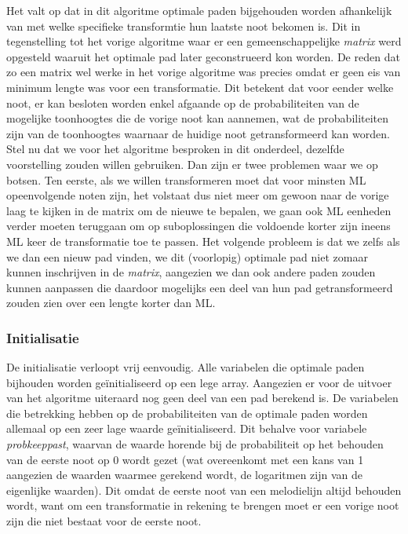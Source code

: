Het valt op dat in dit algoritme optimale paden bijgehouden worden afhankelijk van met welke specifieke transformtie hun laatste noot bekomen is. Dit in tegenstelling tot het vorige algoritme waar er een gemeenschappelijke \textit{matrix} werd opgesteld waaruit het optimale pad later geconstrueerd kon worden. De reden dat zo een matrix wel werke in het vorige algoritme was precies omdat er geen eis van minimum lengte was voor een transformatie. Dit betekent dat voor eender welke noot, er kan besloten worden enkel afgaande op de probabiliteiten van de mogelijke toonhoogtes die de vorige noot kan aannemen, wat de probabiliteiten zijn van de toonhoogtes waarnaar de huidige noot getransformeerd kan worden. Stel nu dat we voor het algoritme besproken in dit onderdeel, dezelfde voorstelling zouden willen gebruiken. Dan zijn er twee problemen waar we op botsen. Ten eerste, als we willen transformeren moet dat voor minsten ML opeenvolgende noten zijn, het volstaat dus niet meer om gewoon naar de vorige laag te kijken in de matrix om de nieuwe te bepalen, we gaan ook ML eenheden verder moeten teruggaan om op suboplossingen die voldoende korter zijn ineens ML keer de transformatie toe te passen. Het volgende probleem is dat we zelfs als we dan een nieuw pad vinden, we dit (voorlopig) optimale pad niet zomaar kunnen inschrijven in de \textit{matrix}, aangezien we dan ook andere paden zouden kunnen aanpassen die daardoor mogelijks een deel van hun pad getransformeerd zouden zien over een lengte korter dan ML. 

\subsubsection{Initialisatie}
De initialisatie verloopt vrij eenvoudig. Alle variabelen die optimale paden bijhouden worden ge\"initialiseerd op een lege array. Aangezien er voor de uitvoer van het algoritme uiteraard nog geen deel van een pad berekend is. De variabelen die betrekking hebben op de probabiliteiten van de optimale paden worden allemaal op een zeer lage waarde ge\"initialiseerd. Dit behalve voor variabele \textit{prob\textunderscore keep\textunderscore past}, waarvan de waarde horende bij de probabiliteit op het behouden van de eerste noot op 0 wordt gezet (wat overeenkomt met een kans van 1 aangezien de waarden waarmee gerekend wordt, de logaritmen zijn van de eigenlijke waarden). Dit omdat de eerste noot van een melodielijn altijd behouden wordt, want om een transformatie in rekening te brengen moet er een vorige noot zijn die niet bestaat voor de eerste noot.

